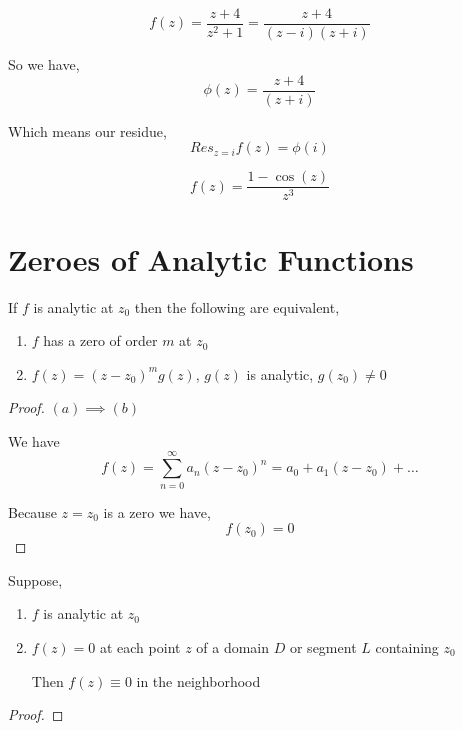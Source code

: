 \begin{eg}
   
   $$ f(z) = \frac{z + 4}{z^2 + 1} = \frac{z + 4}{(z - i)(z + i)} $$ 

   So we have, 
   $$ \phi(z) = \frac{z + 4}{(z + i)} $$ 

   Which means our residue, 
   $$ Res_{z = i}f(z) = \phi(i) $$ 

\end{eg}



\begin{eg}
   
   $$ f(z) = \frac{1 - \cos(z)}{z^{3}}$$


\end{eg}


\section{Zeroes of Analytic Functions}
\begin{theorem}
   If $f$ is analytic at $z_0$ then the following are equivalent, 
   \begin{enumerate}
      \item $f$ has a zero of order $m$ at $z_0$
      \item $f(z) = (z - z_0)^{m}g(z)$, $g(z)$ is analytic, $g(z_0) \ne 0$
   \end{enumerate}
\end{theorem}

\begin{proof}
   $(a) \implies (b)$

   We have  $$f(z) = \sum_{n=0}^{\infty} a_n(z - z_0)^{n} = a_0 + a_1(z - z_0) + \dots$$

   Because $z = z_0$ is a zero we have, 
   $$ f(z_0) = 0 $$ 
\end{proof}


\begin{theorem}
   Suppose, 
   \begin{enumerate}
      \item $f$ is  analytic at $z_0$ 
      \item $f(z) = 0$ at each point $z$ of a domain $D$ or segment $L $ containing $z_0$ 
         
         Then $f(z) \equiv 0$ in the neighborhood
   \end{enumerate}
\end{theorem}

\begin{proof}
\end{proof}

